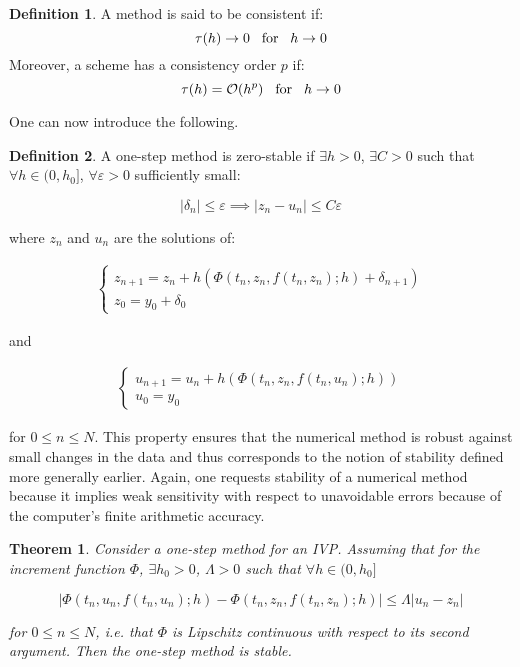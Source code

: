 \documentclass[11pt]{article}
\theoremstyle{theorem}
\newtheorem{theorem}{Theorem}
\theoremstyle{definition}
\newtheorem{definition}{Definition}
\begin{document}
\begin{definition}
	\label{def:consistency}
	A method is said to be consistent if:
	$$\tau(h)\rightarrow 0\hspace{3mm}\text{for}\hspace{3mm}h\rightarrow 0$$
	Moreover, a scheme has a consistency order $p$ if:
	$$\tau(h)=\mathcal{O}(h^p)\hspace{3mm}\text{for}\hspace{3mm}h\rightarrow 0$$
\end{definition}

One can now introduce the following.

\begin{definition}
	\label{def:zero-stability-one-step}
	A one-step method is zero-stable if $\exists h>0$, $\exists C>0$ such that $\forall h\in (0, h_0]$, $\forall\varepsilon>0$ sufficiently small:
	
	$$|\delta_n|\le\varepsilon\implies |z_n-u_n|\le C\varepsilon$$
	
	where $z_n$ and $u_n$ are the solutions of:
	
	\begin{align*}
	\begin{cases}
	z_{n+1}=z_n+h\left(\Phi(t_n, z_n, f(t_n, z_n);h)+\delta_{n+1}\right)\\
	z_0=y_0+\delta_0
	\end{cases}
	\end{align*}
	
	and 
	
	\begin{align*}
	\begin{cases}
	u_{n+1}=u_n+h\left(\Phi(t_n, z_n, f(t_n, u_n);h)\right)\\
	u_0=y_0
	\end{cases}
	\end{align*}
	
	for $0\le n\le N$.
	This property ensures that the numerical method is robust against small changes in
	the data and thus corresponds to the notion of stability defined more generally earlier. Again, one requests stability of a numerical method because it implies weak sensitivity with respect to unavoidable errors because of the computer’s finite arithmetic accuracy.
\end{definition}

\begin{theorem}
	\label{thm:zero-stability}
	Consider a one-step method for an IVP. Assuming that for the increment function $\Phi$, $\exists h_0>0$, $\Lambda>0$ such that $\forall h\in(0, h_0]$
	
	
	$$|\Phi(t_n, u_n, f(t_n, u_n);h)-\Phi(t_n, z_n,f(t_n, z_n);h)|\le\Lambda|u_n-z_n|$$
	
	for $0\le n\le N$, i.e. that $\Phi$ is Lipschitz continuous with respect to its second argument. Then the one-step method is stable.\\
\end{theorem}
\end{document}
